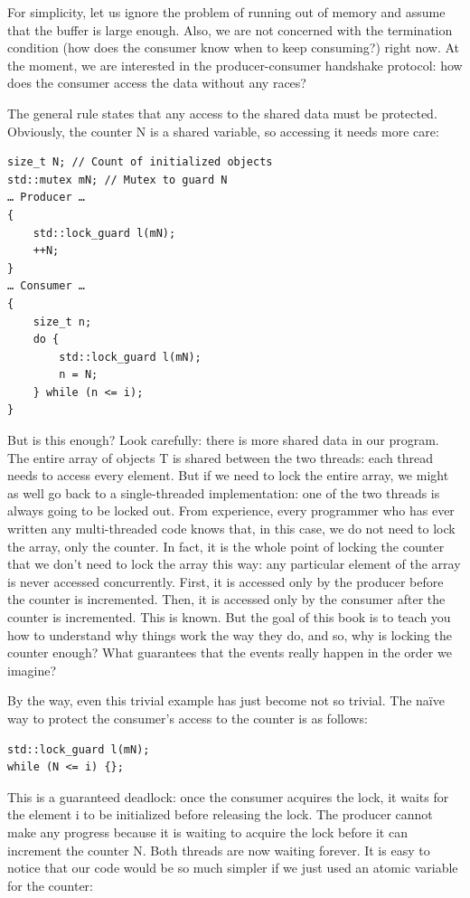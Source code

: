 For simplicity, let us ignore the problem of running out of memory and assume that the buffer is large enough. Also, we are not concerned with the termination condition (how does the consumer know when to keep consuming?) right now. At the moment, we are interested in the producer-consumer handshake protocol: how does the consumer access the data without any races?

The general rule states that any access to the shared data must be protected. Obviously, the counter N is a shared variable, so accessing it needs more care:

\begin{lstlisting}[style=styleCXX]
size_t N; // Count of initialized objects
std::mutex mN; // Mutex to guard N
… Producer …
{
	std::lock_guard l(mN);
	++N;
}
… Consumer …
{
	size_t n;
	do {
		std::lock_guard l(mN);
		n = N;
	} while (n <= i);
}
\end{lstlisting}

But is this enough? Look carefully: there is more shared data in our program. The entire array of objects T is shared between the two threads: each thread needs to access every element. But if we need to lock the entire array, we might as well go back to a single-threaded implementation: one of the two threads is always going to be locked out. From experience, every programmer who has ever written any multi-threaded code knows that, in this case, we do not need to lock the array, only the counter. In fact, it is the whole point of locking the counter that we don't need to lock the array this way: any particular element of the array is never accessed concurrently. First, it is accessed only by the producer before the counter is incremented. Then, it is accessed only by the consumer after the counter is incremented. This is known. But the goal of this book is to teach you how to understand why things work the way they do, and so, why is locking the counter enough? What guarantees that the events really happen in the order we imagine?

By the way, even this trivial example has just become not so trivial. The naïve way to protect the consumer's access to the counter is as follows:

\begin{lstlisting}[style=styleCXX]
std::lock_guard l(mN);
while (N <= i) {};
\end{lstlisting}

This is a guaranteed deadlock: once the consumer acquires the lock, it waits for the element i to be initialized before releasing the lock. The producer cannot make any progress because it is waiting to acquire the lock before it can increment the counter N. Both threads are now waiting forever. It is easy to notice that our code would be so much simpler if we just used an atomic variable for the counter:

